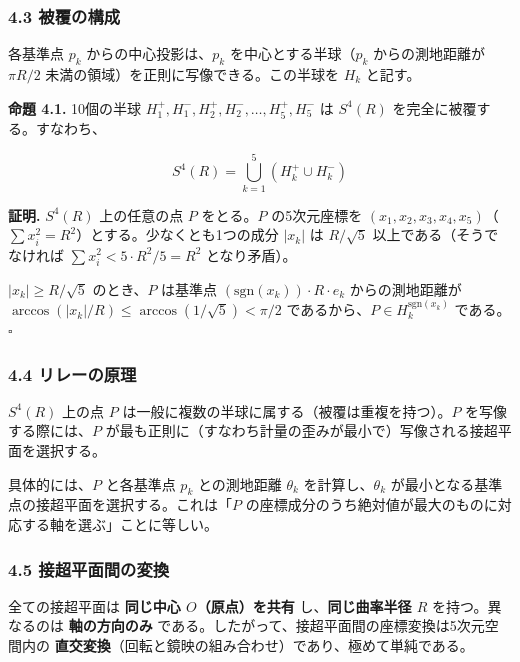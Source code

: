 \documentclass[a4paper,11pt]{ltjsarticle}
\begin{document}
\subsubsection{4.3 被覆の構成}\label{ux88abux8986ux306eux69cbux6210}

各基準点 \(p_k\) からの中心投影は、\(p_k\) を中心とする半球（\(p_k\)
からの測地距離が \(\pi R / 2\)
未満の領域）を正則に写像できる。この半球を \(H_k\) と記す。

\textbf{命題 4.1.} 10個の半球
\(H_1^+, H_1^-, H_2^+, H_2^-, \ldots, H_5^+, H_5^-\) は \(S^4(R)\)
を完全に被覆する。すなわち、

\[S^4(R) = \bigcup_{k=1}^{5} \left( H_k^+ \cup H_k^- \right)\]

\textbf{証明.} \(S^4(R)\) 上の任意の点 \(P\) をとる。\(P\) の5次元座標を
\((x_1, x_2, x_3, x_4, x_5)\)（\(\sum x_i^2 = R^2\)）とする。少なくとも1つの成分
\(|x_k|\) は \(R/\sqrt{5}\) 以上である（そうでなければ
\(\sum x_i^2 < 5 \cdot R^2/5 = R^2\) となり矛盾）。

\(|x_k| \geq R/\sqrt{5}\) のとき、\(P\) は基準点
\((\text{sgn}(x_k)) \cdot R \cdot e_k\) からの測地距離が
\(\arccos(|x_k|/R) \leq \arccos(1/\sqrt{5}) < \pi/2\)
であるから、\(P \in H_k^{\text{sgn}(x_k)}\) である。\(\square\)

\subsubsection{4.4
リレーの原理}\label{ux30eaux30ecux30fcux306eux539fux7406}

\(S^4(R)\) 上の点 \(P\)
は一般に複数の半球に属する（被覆は重複を持つ）。\(P\)
を写像する際には、\(P\)
が最も正則に（すなわち計量の歪みが最小で）写像される接超平面を選択する。

具体的には、\(P\) と各基準点 \(p_k\) との測地距離 \(\theta_k\)
を計算し、\(\theta_k\)
が最小となる基準点の接超平面を選択する。これは「\(P\)
の座標成分のうち絶対値が最大のものに対応する軸を選ぶ」ことに等しい。

\subsubsection{4.5
接超平面間の変換}\label{ux63a5ux8d85ux5e73ux9762ux9593ux306eux5909ux63db}

全ての接超平面は \textbf{同じ中心 \(O\)（原点）を共有}
し、\textbf{同じ曲率半径 \(R\)} を持つ。異なるのは \textbf{軸の方向のみ}
である。したがって、接超平面間の座標変換は5次元空間内の
\textbf{直交変換}（回転と鏡映の組み合わせ）であり、極めて単純である。
\end{document}
